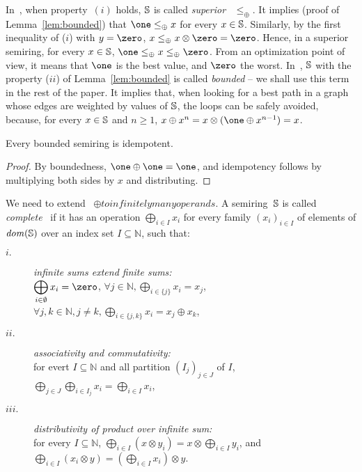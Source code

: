 In~\cite{Huang08advanceddynamic}, when  property~$(i)$ holds,
$\mathbb{S}$ is called \emph{superior} \wrt~$\leq_\oplus$.
It implies (proof of Lemma~\ref{lem:bounded})
that
$\one \leq_\oplus x$ for every $x \in \mathbb{S}$.
Similarly, by the first inequality of ($i$) with $y = \zero$,
$x \leq_\oplus x \otimes \zero = \zero$.
%
Hence, in a superior semiring,
for every $x \in \mathbb{S}$, $\one \leq_\oplus x \leq_\oplus \zero$.
%
From an optimization point of view,
it means that $\one$ is the best value, and $\zero$ the worst.
%
In~\cite{Mohri02semiring},
$\mathbb{S}$ with the property ($ii$) of Lemma~\ref{lem:bounded}
is called \emph{bounded} -- we shall use this term in the rest of the paper.
It implies that, when looking for a best path in a graph whose edges
are weighted by values of $\mathbb{S}$, the loops can be safely avoided,
because, for every $x \in \mathbb{S}$ and $n \geq 1$,
 $x \oplus x^n = x \otimes (\one \oplus x^{n-1}) = x$.


\begin{lemma}\label{lem:idempotent}
Every bounded semiring is idempotent.
\end{lemma}
\begin{proof}
By boundedness, $\one \oplus \one = \one$,
and idempotency follows by multiplying
both sides by $x$ and distributing.
\end{proof}

\noindent
We need to extend ~$\oplus to infinitely many operands$.
A semiring~$\mathbb{S}$ is called \emph{complete}~\cite{Droste09handbook}
if it has an %
operation $\bigoplus_{i \in I} x_i$
for every family
$(x_i)_{i \in I}$ %
of elements of $\mathit{dom}(\mathbb{S})$ over an index set $I \subseteq \mathbb{N}$, such that:
\begin{description}
\item[$i.$]
\emph{infinite sums extend finite sums:}\\
$\displaystyle\bigoplus_{i \in \emptyset} x_i = \zero$,\quad
      $\forall j\in \mathbb{N}, \displaystyle\bigoplus_{i \in \{ j \}} x_i = x_j$,
      $\forall j, k\in \mathbb{N}, j\neq k,
      \displaystyle\bigoplus_{i \in \{ j, k \}} x_i = x_j \oplus x_k$,
%
\item[$ii.$]
\emph{associativity and commutativity:}\\
for evert $I \subseteq \mathbb{N}$
and all partition $(I_{j})_{j \in J}$ of $I$, %
\(
\displaystyle
\bigoplus_{j \in J}\bigoplus_{i \in I_j} x_i =
\bigoplus_{i \in I} x_i
\),
%
\item[$iii.$]
\emph{distributivity of product over infinite sum:}\\
for every $I \subseteq \mathbb{N}$,
\(
\displaystyle
\bigoplus_{i \in I} (x \otimes y_i) = x \otimes \bigoplus_{i\in I} y_i\), and
\(
\displaystyle
\bigoplus_{i \in I} (x_i \otimes y) = (\bigoplus_{i \in I} x_i ) \otimes y\).
\end{description}



